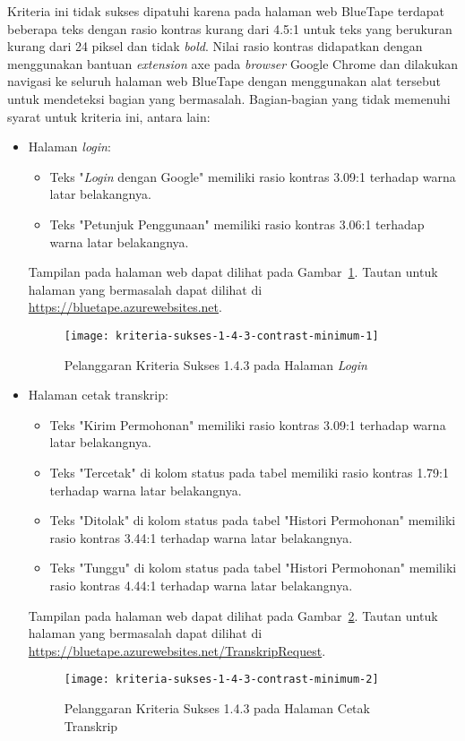 Kriteria ini tidak sukses dipatuhi karena pada halaman web BlueTape terdapat beberapa teks dengan rasio kontras kurang dari 4.5:1 untuk teks yang berukuran kurang dari 24 piksel dan tidak \textit{bold}. Nilai rasio kontras didapatkan dengan menggunakan bantuan \textit{extension} axe pada \textit{browser} Google Chrome dan dilakukan navigasi ke seluruh halaman web BlueTape dengan menggunakan alat tersebut untuk mendeteksi bagian yang bermasalah. Bagian-bagian yang tidak memenuhi syarat untuk kriteria ini, antara lain:

\begin{itemize}
    \item Halaman \textit{login}: 
    \begin{itemize}
        \item Teks "\textit{Login} dengan Google" memiliki rasio kontras 3.09:1 terhadap warna latar belakangnya.
        \item Teks "Petunjuk Penggunaan" memiliki rasio kontras 3.06:1 terhadap warna latar belakangnya.
    \end{itemize}
    Tampilan pada halaman web dapat dilihat pada \mbox{Gambar \ref{fig:1.4.3_contrast_minimum_1}}. Tautan untuk halaman yang bermasalah dapat dilihat di \url{https://bluetape.azurewebsites.net}.
    \begin{figure}[H]
        \centering  
        \texttt{[image: kriteria-sukses-1-4-3-contrast-minimum-1]}  
        \caption[Pelanggaran Kriteria Sukses 1.4.3 pada Halaman \textit{Login}]{Pelanggaran Kriteria Sukses 1.4.3 pada Halaman \textit{Login}}
        \label{fig:1.4.3_contrast_minimum_1}  
    \end{figure} 
    
    \item Halaman cetak transkrip: 
    \begin{itemize}
        \item Teks "Kirim Permohonan" memiliki rasio kontras 3.09:1 terhadap warna latar belakangnya.
        \item Teks "Tercetak" di kolom status pada tabel memiliki rasio kontras 1.79:1 terhadap warna latar belakangnya.
        \item Teks "Ditolak" di kolom status pada tabel "Histori Permohonan" memiliki rasio kontras 3.44:1 terhadap warna latar belakangnya.
        \item Teks "Tunggu" di kolom status pada tabel "Histori Permohonan" memiliki rasio kontras 4.44:1 terhadap warna latar belakangnya.
    \end{itemize}   
    Tampilan pada halaman web dapat dilihat pada \mbox{Gambar \ref{fig:1.4.3_contrast_minimum_2}}. Tautan untuk halaman yang bermasalah dapat dilihat di \url{https://bluetape.azurewebsites.net/TranskripRequest}.
    \begin{figure}[H]
        \centering  
        \texttt{[image: kriteria-sukses-1-4-3-contrast-minimum-2]}  
        \caption[Pelanggaran Kriteria Sukses 1.4.3 pada Halaman Cetak Transkrip]{Pelanggaran Kriteria Sukses 1.4.3 pada Halaman Cetak Transkrip}
        \label{fig:1.4.3_contrast_minimum_2}  
    \end{figure} 
    

\end{itemize}
